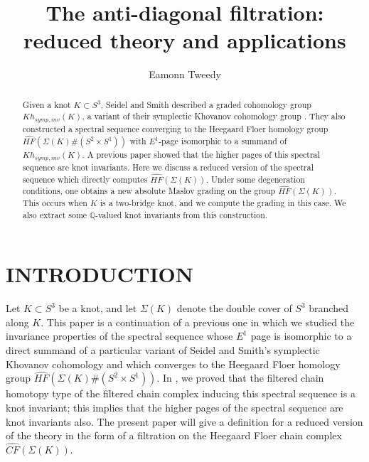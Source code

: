 \documentclass[11pt]{article}
\theoremstyle{plain} \newtheorem{thm}{Theorem}[subsection]
\theoremstyle{plain} \newtheorem{cor}[thm]{Corollary}
\theoremstyle{plain} \newtheorem{prop}[thm]{Proposition}
\theoremstyle{plain} \newtheorem{conj}[thm]{Conjecture}
\theoremstyle{plain} \newtheorem{lem}[thm]{Lemma}
\theoremstyle{definition} \newtheorem{df}[thm]{Definition}
\theoremstyle{remark} \newtheorem{rmk}[thm]{Remark}
\theoremstyle{remark} \newtheorem{obs}[thm]{Observation}
\newcommand{\DBC}[1]{\Sigma(#1)}
\numberwithin{equation}{section}
\begin{document}
\allsectionsfont{\mdseries\itshape}
\sectionfont{\centering \mdseries \itshape}

\title{The anti-diagonal filtration: reduced theory and applications} 
\author{Eamonn Tweedy} 
\maketitle

\begin{abstract} 
Given a knot $K \subset S^3$, Seidel and Smith described a graded cohomology group $Kh_{symp,inv}(K)$, a variant of their symplectic Khovanov cohomology group \cite{ss:R2}.  They also constructed a spectral sequence converging to the Heegaard Floer homology group $\widehat{HF}(\DBC{K}\#(S^{2}\times S^{1}))$ with $E^{1}$-page isomorphic to a summand of $Kh_{symp,inv}(K)$.  A previous paper \cite{et:R} showed that the higher pages of this spectral sequence are knot invariants.  Here we discuss a reduced version of the spectral sequence which directly computes $\widehat{HF}(\DBC{K})$.  Under some degeneration conditions, one obtains a new absolute Maslov grading on the group $\widehat{HF}(\DBC{K})$.  This occurs when $K$ is a two-bridge knot, and we compute the grading in this case.  We also extract some $\mathbb{Q}$-valued knot invariants from this construction.
\end{abstract} 

\clearpage

\section{INTRODUCTION}\label{sec:intro}

Let $K \subset S^{3}$ be a knot, and let $\DBC{K}$ denote the double cover of $S^{3}$ branched along $K$.  This paper is a continuation of a previous one \cite{et:R} in which we studied the invariance properties of the spectral sequence whose $E^{1}$ page is isomorphic to a direct summand of a particular variant of Seidel and Smith's symplectic Khovanov cohomology and which converges to the Heegaard Floer homology group $\widehat{HF}(\DBC{K}\#(S^{2}\times S^{1}))$.  In \cite{et:R}, we proved that the filtered chain homotopy type of the filtered chain complex inducing this spectral sequence is a knot invariant; this implies that the higher pages of the spectral sequence are knot invariants also.  The present paper will give a definition for a reduced version of the theory in the form of a filtration on the Heegaard Floer chain complex $\widehat{CF}(\DBC{K})$.
\end{document}
